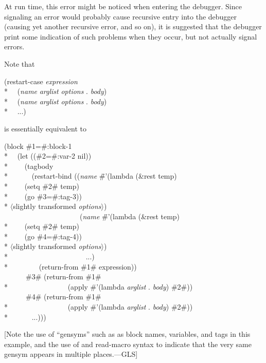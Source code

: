 \begin{defmac}
\begin{flushdesc}
\begin{implementation}
      At run time, this error might be noticed when entering
      the debugger. Since signaling an error would probably cause recursive
      entry into the debugger (causing yet another recursive error, and so on), it is
      suggested that the debugger print some indication of such problems when
      they occur, but not actually signal errors.
\end{implementation}
\afternoterule
\end{flushdesc}

Note that 
\begin{lisp}
(restart-case \emph{expression} \\*
~~(\emph{name} \emph{arglist} \emph{options} . \emph{body}) \\*
~~(\emph{name} \emph{arglist} \emph{options} . \emph{body}) \\*
~~...)
\end{lisp}
is essentially equivalent to
\begin{lisp}
(block \#1=\#:block-1 \\*
~~(let ((\#2=\#:var-2 nil)) \\*
~~~~(tagbody \\*
~~~~~~(restart-bind ((\emph{name} \pushtabs\=\#'(lambda (\&rest temp) \\*
\>~~~~(setq \#2\# temp) \\*
\>~~~~(go \#3=\#:tag-3)) \\*
\>\textrm{$\langle$slightly transformed \emph{options}$\rangle$})\poptabs \\
~~~~~~~~~~~~~~~~~~~~~(\emph{name} \pushtabs\=\#'(lambda (\&rest temp) \\*
\>~~~~(setq \#2\# temp) \\*
\>~~~~(go \#4=\#:tag-4)) \\*
\>\textrm{$\langle$slightly transformed \emph{options}$\rangle$})\poptabs \\*
~~~~~~~~~~~~~~~~~~~~~...) \\*
~~~~~~~~(return-from \#1\# expression)) \\
~~~~~~\#3\# (return-from \#1\# \\*
~~~~~~~~~~~~~~~~(apply \#'(lambda \emph{arglist} . \emph{body}) \#2\#)) \\
~~~~~~\#4\# (return-from \#1\# \\*
~~~~~~~~~~~~~~~~(apply \#'(lambda \emph{arglist} . \emph{body}) \#2\#)) \\*
~~~~~~...)))
\end{lisp}
[Note the use of ``gensyms'' such as  as block names,
variables, and  tags in this example,
and the use of  and  read-macro syntax
to indicate that the very same gensym appears in multiple places.---GLS]



\end{defmac}
